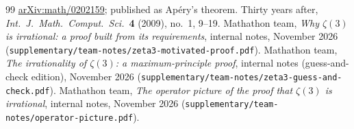 \documentclass[11pt]{article}
\theoremstyle{plain}
\theoremstyle{definition}
\theoremstyle{remark}
\begin{document}
\begin{thebibliography}{99}
  \href{https://arxiv.org/abs/math/0202159}{arXiv:math/0202159}; published as Ap\'ery's theorem.
  Thirty years after, \emph{Int.\ J.\ Math.\ Comput.\ Sci.}\ \textbf{4} (2009), no.~1, 9--19.
 Mathathon team, \emph{Why $\zeta(3)$ is irrational: a proof built from its
  requirements}, internal notes, November 2026
  (\texttt{supplementary/team-notes/zeta3-motivated-proof.pdf}).
 Mathathon team, \emph{The irrationality of $\zeta(3)$: a maximum-principle
  proof}, internal notes (guess-and-check edition), November 2026
  (\texttt{supplementary/team-notes/zeta3-guess-and-check.pdf}).
 Mathathon team, \emph{The operator picture of the proof that $\zeta(3)$ is
  irrational}, internal notes, November 2026 (\texttt{supplementary/team-notes/operator-picture.pdf}).
\end{thebibliography}
\end{document}
